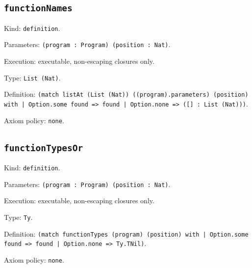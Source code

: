 \documentclass[11pt]{article}
\begin{document}
\subsection*{\texttt{functionNames}}
\noindent Kind: \texttt{definition}.\par
\noindent Parameters: \texttt{(program : Program) (position : Nat)}.\par
\noindent Execution: executable, non-escaping closures only.\par
\noindent Type: \texttt{List (Nat)}.\par
\noindent Definition: \texttt{(match listAt (List (Nat)) ((program).parameters) (position) with | Option.some found => found | Option.none => ([] : List (Nat)))}.\par
\noindent Axiom policy: \texttt{none}.\par
\subsection*{\texttt{functionTypesOr}}
\noindent Kind: \texttt{definition}.\par
\noindent Parameters: \texttt{(program : Program) (position : Nat)}.\par
\noindent Execution: executable, non-escaping closures only.\par
\noindent Type: \texttt{Ty}.\par
\noindent Definition: \texttt{(match functionTypes (program) (position) with | Option.some found => found | Option.none => Ty.TNil)}.\par
\noindent Axiom policy: \texttt{none}.\par
\end{document}
